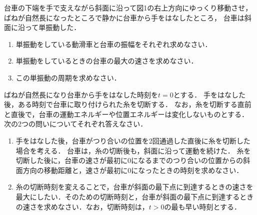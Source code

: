 台車の下端を手で支えながら斜面に沿って図1の右上方向にゆっくり移動させ，
ばねが自然長になったところで静かに台車から手をはなしたところ，
台車は斜面に沿って単振動した．



\begin{enumerate}[（1）]
  \setlength{\leftskip}{-1zw}
  \setlength{\itemindent}{1zw}\setlength{\labelsep}{0.5zw}
  \setlength{\labelwidth}{1zw}\setlength{\leftmargin}{1zw}
  \setlength{\itemsep}{0.5\baselineskip}
  \addtocounter{enumi}{3}
  \item 単振動をしている動滑車と台車の振幅をそれぞれ求めなさい．
  \item 単振動をしているときの台車の最大の速さを求めなさい．
  \item この単振動の周期を求めなさい．
\end{enumerate}



ばねが自然長になり台車から手をはなした時刻を$t=0$とする．
手をはなした後，ある時刻で台車に取り付けられた糸を切断する．
なお，糸を切断する直前と直後で，台車の運動エネルギーや位置エネルギーは変化しないものとする．
次の2つの問いについてそれぞれ答えなさい．



\begin{enumerate}[（1）]
  \setlength{\leftskip}{-1zw}
  \setlength{\itemindent}{1zw}\setlength{\labelsep}{0.5zw}
  \setlength{\labelwidth}{1zw}\setlength{\leftmargin}{1zw}
  \setlength{\itemsep}{0.5\baselineskip}
  \addtocounter{enumi}{6}
  \item 手をはなした後，台車がつり合いの位置を2回通過した直後に糸を切断した場合を考える．
  台車は，糸の切断後も，斜面に沿って運動を続けた．
  糸を切断した後に，台車の速さが最初に0になるまでのつり合いの位置からの斜面方向の移動距離と，速さが最初に0になったときの時刻を求めなさい．
  \item 糸の切断時刻を変えることで，台車が斜面の最下点に到達するときの速さを最大にしたい．そのための切断時刻と，台車が斜面の最下点に到達するときの速さを求めなさい．なお，切断時刻は，$t>0$の最も早い時刻とする．
\end{enumerate}

